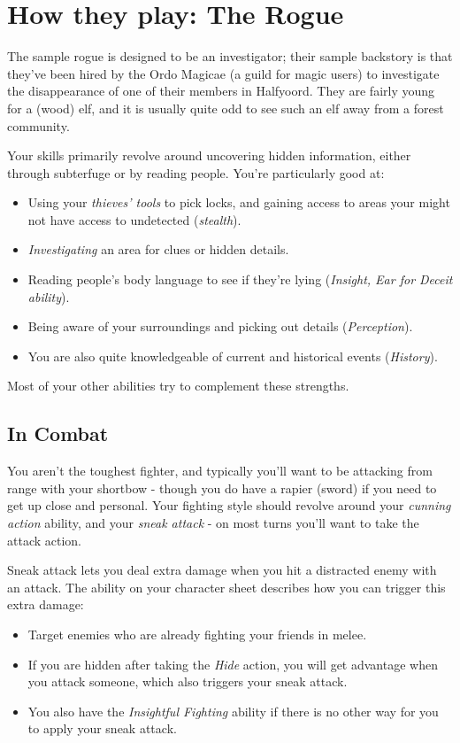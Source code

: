 \documentclass[10pt,a4paper]{article}
\begin{document}
\newpage

\section{How they play: The Rogue}

The sample rogue is designed to be an investigator; their sample backstory is that they've been hired by the Ordo Magicae (a guild for magic users) to investigate the disappearance of one of their members in Halfyoord.
They are fairly young for a (wood) elf, and it is usually quite odd to see such an elf away from a forest community.

Your skills primarily revolve around uncovering hidden information, either through subterfuge or by reading people.
You're particularly good at:
\begin{itemize}
    \item Using your \emph{thieves' tools} to pick locks, and gaining access to areas your might not have access to undetected (\emph{stealth}).
    \item \emph{Investigating} an area for clues or hidden details.
    \item Reading people's body language to see if they're lying (\emph{Insight, Ear for Deceit ability}).
    \item Being aware of your surroundings and picking out details (\emph{Perception}).
    \item You are also quite knowledgeable of current and historical events (\emph{History}).
\end{itemize}

Most of your other abilities try to complement these strengths.

\subsection{In Combat}

You aren't the toughest fighter, and typically you'll want to be attacking from range with your shortbow - though you do have a rapier (sword) if you need to get up close and personal.
Your fighting style should revolve around your \emph{cunning action} ability, and your \emph{sneak attack} - on most turns you'll want to take the attack action.

Sneak attack lets you deal extra damage when you hit a distracted enemy with an attack.
The ability on your character sheet describes how you can trigger this extra damage:
\begin{itemize}
    \item Target enemies who are already fighting your friends in melee.
    \item If you are hidden after taking the \emph{Hide} action, you will get advantage when you attack someone, which also triggers your sneak attack.
    \item You also have the \emph{Insightful Fighting} ability if there is no other way for you to apply your sneak attack.
\end{itemize}
\end{document}
